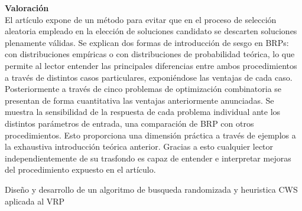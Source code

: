 \documentclass[11pt]{article} %
\begin{document}
\textbf{Valoración}\\[0.2cm]

El artículo expone de un método para evitar que en el proceso de selección aleatoria empleado en la elección de soluciones candidato se descarten soluciones plenamente válidas. Se explican dos formas de introducción de sesgo en BRPs: con distribuciones empíricas o con distribuciones de probabilidad teórica, lo que permite al lector entender las principales diferencias entre ambos procedimientos a través de distintos casos particulares, exponiéndose las ventajas de cada caso. Posteriormente a través de cinco problemas de optimización combinatoria se presentan de forma cuantitativa las ventajas anteriormente anunciadas. Se muestra la sensibilidad de la respuesta de cada problema individual ante los distintos parámetros de entrada, una comparación de BRP con otros procedimientos. Esto proporciona una dimensión práctica a través de ejemplos a la exhaustiva introducción teórica anterior. Gracias a esto cualquier lector independientemente de su trasfondo es capaz de entender e interpretar mejoras del procedimiento expuesto en el artículo.

\clearpage

{\fontsize{50}{60}\selectfont Diseño y desarrollo de un algoritmo de busqueda randomizada y heuristica CWS aplicada al VRP}
\end{document}
